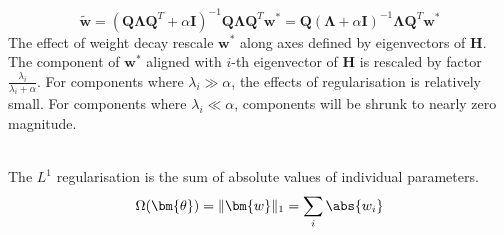 \begin{remark}
\begin{equation*}
\tilde{\bm{w}} = (\bm{Q} \bm{\Lambda} \bm{Q}^T + \alpha \bm{I})^{-1} \bm{Q} \bm{\Lambda} \bm{Q}^T \bm{w}^* = \bm{Q} (\bm{\Lambda} + \alpha \bm{I})^{-1} \bm{\Lambda} \bm{Q}^T \bm{w}^* \nonumber
\end{equation*}
The effect of weight decay rescale $\bm{w}^*$ along axes defined by eigenvectors of $\bm{H}$. The component of $\bm{w}^*$ aligned with $i$-th eigenvector of $\bm{H}$ is rescaled by factor $\frac{\lambda_i}{\lambda_i + \alpha}$. For components where $\lambda_i \gg \alpha$, the effects of regularisation is relatively small. For components where $\lambda_i \ll \alpha$, components will be shrunk to nearly zero magnitude.
\end{remark}

\begin{definition} \\
The $L^1$ regularisation is the sum of absolute values of individual parameters.
\begin{equation*}
\Omega(\bm{\theta}) = \Vert \bm{w} \Vert_1 = \sum_i \abs{w_i} \nonumber
\end{equation*}
\end{definition}

